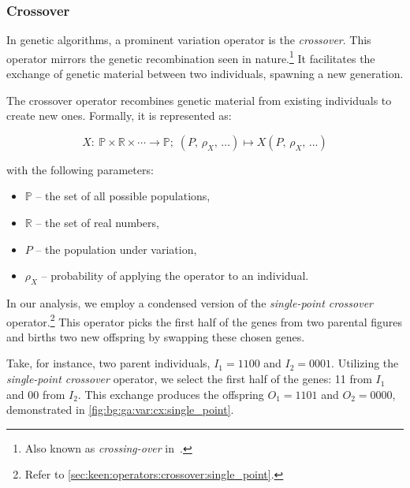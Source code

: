 
\subsubsection{Crossover}
\label{sec:bg:ga:var:cx}
  In genetic algorithms, a prominent variation operator is the 
  \emph{crossover}.
  This operator mirrors the genetic recombination seen in nature.\footnote{
    Also known as \emph{crossing-over} 
    in~\autocite{hollandAdaptationNaturalArtificial1992a}.
  }
  It facilitates the exchange of genetic material between two individuals, 
  spawning a new generation.

  \begin{definition}
  \label{def:crossover_operator}
    The crossover operator recombines genetic material from existing 
    individuals to create new ones.
    Formally, it is represented as:

    \[
      X :\: \mathbb{P} \times \mathbb{R} \times \cdots \to \mathbb{P};\;
      (P,\, \rho_X,\, \dots) \mapsto X(P,\, \rho_X,\, \dots)
    \]

    with the following parameters:

    \begin{itemize}
      \item \(\mathbb{P}\) -- the set of all possible populations,
      \item \(\mathbb{R}\) -- the set of real numbers,
      \item \(P\) -- the population under variation,
      \item \(\rho_X\) -- probability of applying the operator to an individual.
    \end{itemize}
  \end{definition}

  In our analysis, we employ a condensed version of the \emph{single-point 
  crossover} operator.\footnote{
    Refer to \vref{sec:keen:operators:crossover:single_point}.
  }
  This operator picks the first half of the genes from two parental figures and 
  births two new offspring by swapping these chosen genes. 

  Take, for instance, two parent individuals, \(I_1 = 1100\) and \(I_2 = 
  0001\).
  Utilizing the \textit{single-point crossover} operator, we select the first 
  half of the genes: 11 from \(I_1\) and 00 from \(I_2\).
  This exchange produces the offspring \(O_1 = 1101\) and \(O_2 = 0000\), 
  demonstrated in 
  \vref{fig:bg:ga:var:cx:single_point}.

